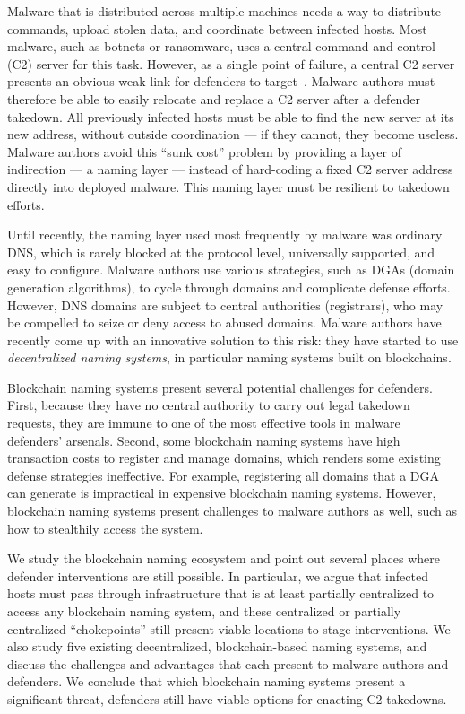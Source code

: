 Malware that is distributed across multiple machines needs a way to distribute 
commands, upload stolen 
data, and coordinate between infected hosts. Most malware, such as botnets or 
ransomware, uses a 
central command and control (C2) server for this task. However, as a single 
point of failure, a 
central C2 server presents an obvious weak link for defenders to 
target~\cite{kesari_deterring_2017}. 
Malware authors must therefore be able to easily relocate and replace a C2 
server after a defender 
takedown. All previously infected hosts must be able to find the new server at 
its new address, 
without outside coordination --- if they cannot, they become useless. Malware 
authors avoid 
this ``sunk cost'' problem by providing a layer of indirection --- a naming 
layer --- instead of 
hard-coding a fixed C2 server address directly into deployed malware. This 
naming layer must be 
resilient to takedown efforts.

Until recently, the naming layer used most frequently by malware was ordinary 
DNS, which is rarely 
blocked at the protocol level, universally supported, and easy to configure. 
Malware authors use 
various strategies, such as DGAs (domain generation 
algorithms), 
to cycle through domains and complicate defense efforts. 
However, 
DNS domains are subject 
to central authorities (registrars), who may be compelled to 
seize or deny access to abused 
domains. Malware 
authors have recently come up with an innovative solution to this risk: they 
have started to use 
\emph{decentralized naming systems}, in particular naming systems built on 
blockchains. 

Blockchain naming systems present several potential 
challenges for 
defenders. First, because they 
have no central authority to carry out legal takedown 
requests, they are immune to one of the most effective tools 
in malware defenders' arsenals. Second, some blockchain 
naming systems 
have high transaction costs to register and manage domains, 
which renders some existing defense 
strategies ineffective. For example, registering all domains 
that a DGA can generate 
is impractical in expensive blockchain naming systems. 
However, blockchain naming systems 
present challenges to malware authors as well, such as how to stealthily access 
the system.

We study the blockchain naming ecosystem and point out 
several places where defender interventions are still 
possible. In particular, we argue that infected hosts must 
pass through infrastructure that is at least 
partially centralized to access any blockchain naming system, 
and these centralized or partially centralized 
``chokepoints'' still present viable locations to stage 
interventions. We also study five existing decentralized, 
blockchain-based naming systems, and discuss the challenges 
and advantages that each present to malware authors and 
defenders. We conclude that which blockchain 
naming systems present a significant threat, defenders still 
have viable options for enacting C2 takedowns.

